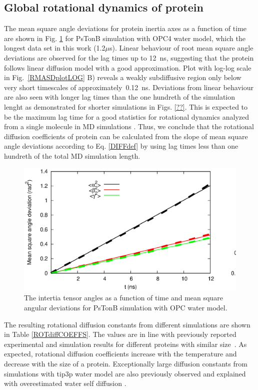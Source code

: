 \documentclass[pre,aps,floatfix,authordate1-4,twocolumn]{revtex4-1}
\begin{document}
\subsection{Global rotational dynamics of protein}
The mean square angle deviations for protein inertia axes
as a function of time are shown in Fig. \ref{RMASDplot}
for PsTonB simulation with OPC4 water model, which the longest
data set in this work (1.2$\mu$s).
Linear behaviour of root mean square angle deviations are observed
for the lag times up to 12~ns, suggesting that the protein follows linear diffusion model with a
good approximation. Plot with log-log scale in Fig.~\ref{RMASDplotLOG} B)
reveals a weakly subdiffusive region only below very short timescales
of approximately~0.12~ns. Deviations from linear behaviour are also
seen with longer lag times than the one hundreth of the simulation lenght as
demonstrated for shorter simulations in Figs. \ref{??}.
This is expected to be the maximum lag time for a good statistics
for rotational dynamics analyzed from a single molecule in MD simulations \cite{lu06}.
Thus, we conclude that the rotational diffusion coefficients of protein can
be calculated from the slope of mean square angle
deviations according to Eq. \ref{DIFFdef} by using lag times less than
one hundreth of the total MD simulation length.
\begin{figure}[htb]
  \includegraphics[width=16.5cm]{../Figs/RMASDplotPsTonBOPC4.eps}%
  \caption{The intertia tensor angles as a function of time and mean square angular
    deviations for PsTonB simulation with OPC water model.
    \label{RMASDplot}}%
\end{figure}

The resulting rotational diffusion constants from different simulations are
shown in Table \ref{ROTdiffCOEFFS}. The values are in line with
previously reported experimental and simulation results for different proteins
with similar size~\cite{wong08,krishnan98}. As expected,
rotational diffusion coefficients increase with the temperature and decrease with the
size of a protein.  Exceptionally large diffusion constants from simulations
with tip3p water model are also previously observed and explained with
overestimated water self diffusion \cite{wong08}.
\end{document}
